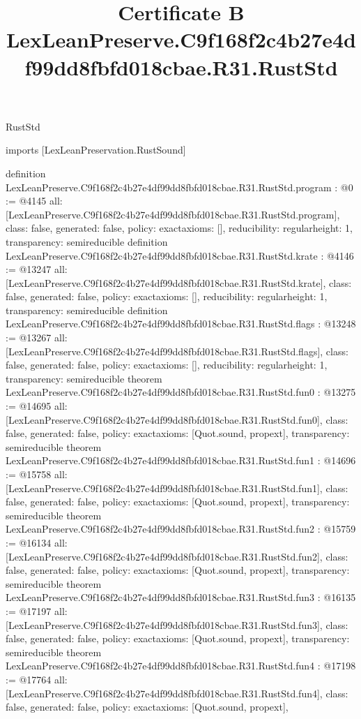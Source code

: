 \begin{lexlean}{RustStd}
\title{Certificate B LexLeanPreserve.C9f168f2c4b27e4df99dd8fbfd018cbae.R31.RustStd}
\begin{coremodule}
imports [LexLeanPreservation.RustSound]

definition LexLeanPreserve.C9f168f2c4b27e4df99dd8fbfd018cbae.R31.RustStd.program : @0 := @4145 {
  all: [LexLeanPreserve.C9f168f2c4b27e4df99dd8fbfd018cbae.R31.RustStd.program],
  class: false,
  generated: false,
  policy: exact{axioms: []},
  reducibility: regular{height: 1},
  transparency: semireducible
}
definition LexLeanPreserve.C9f168f2c4b27e4df99dd8fbfd018cbae.R31.RustStd.krate : @4146 := @13247 {
  all: [LexLeanPreserve.C9f168f2c4b27e4df99dd8fbfd018cbae.R31.RustStd.krate],
  class: false,
  generated: false,
  policy: exact{axioms: []},
  reducibility: regular{height: 1},
  transparency: semireducible
}
definition LexLeanPreserve.C9f168f2c4b27e4df99dd8fbfd018cbae.R31.RustStd.flags : @13248 := @13267 {
  all: [LexLeanPreserve.C9f168f2c4b27e4df99dd8fbfd018cbae.R31.RustStd.flags],
  class: false,
  generated: false,
  policy: exact{axioms: []},
  reducibility: regular{height: 1},
  transparency: semireducible
}
theorem LexLeanPreserve.C9f168f2c4b27e4df99dd8fbfd018cbae.R31.RustStd.fun0 : @13275 := @14695 {
  all: [LexLeanPreserve.C9f168f2c4b27e4df99dd8fbfd018cbae.R31.RustStd.fun0],
  class: false,
  generated: false,
  policy: exact{axioms: [Quot.sound, propext]},
  transparency: semireducible
}
theorem LexLeanPreserve.C9f168f2c4b27e4df99dd8fbfd018cbae.R31.RustStd.fun1 : @14696 := @15758 {
  all: [LexLeanPreserve.C9f168f2c4b27e4df99dd8fbfd018cbae.R31.RustStd.fun1],
  class: false,
  generated: false,
  policy: exact{axioms: [Quot.sound, propext]},
  transparency: semireducible
}
theorem LexLeanPreserve.C9f168f2c4b27e4df99dd8fbfd018cbae.R31.RustStd.fun2 : @15759 := @16134 {
  all: [LexLeanPreserve.C9f168f2c4b27e4df99dd8fbfd018cbae.R31.RustStd.fun2],
  class: false,
  generated: false,
  policy: exact{axioms: [Quot.sound, propext]},
  transparency: semireducible
}
theorem LexLeanPreserve.C9f168f2c4b27e4df99dd8fbfd018cbae.R31.RustStd.fun3 : @16135 := @17197 {
  all: [LexLeanPreserve.C9f168f2c4b27e4df99dd8fbfd018cbae.R31.RustStd.fun3],
  class: false,
  generated: false,
  policy: exact{axioms: [Quot.sound, propext]},
  transparency: semireducible
}
theorem LexLeanPreserve.C9f168f2c4b27e4df99dd8fbfd018cbae.R31.RustStd.fun4 : @17198 := @17764 {
  all: [LexLeanPreserve.C9f168f2c4b27e4df99dd8fbfd018cbae.R31.RustStd.fun4],
  class: false,
  generated: false,
  policy: exact{axioms: [Quot.sound, propext]},
}
\end{coremodule}
\end{lexlean}

